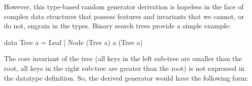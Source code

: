 However, this type-based random generator derivation is hopeless in the face of complex
data structures that possess features and invariants that we cannot, or do not, engrain
in the types. Binary search trees provide a simple example:

\begin{code}[language=Haskell]
data Tree a = Leaf | Node (Tree a) a (Tree a)
\end{code}

\noindent The core invariant of the tree (all keys in the left sub-tree are smaller than the
root, all keys in the right sub-tree are greater than the root) is not expressed in the
datatype definition. So, the derived generator would have the following form:


